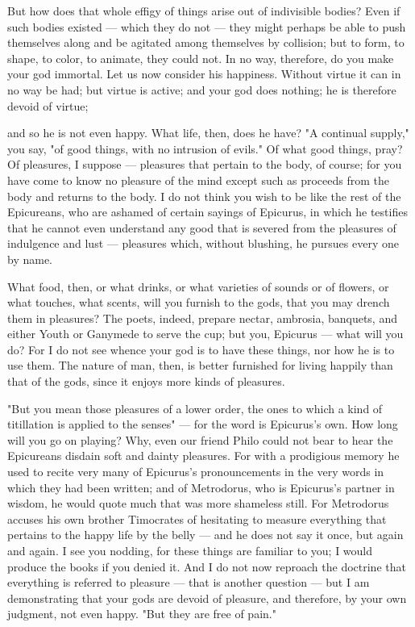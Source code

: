  But how does that whole effigy of things arise out of indivisible bodies? Even if such bodies existed — which they do not — they might perhaps be able to push themselves along and be agitated among themselves by collision; but to form, to shape, to color, to animate, they could not. In no way, therefore, do you make your god immortal. Let us now consider his happiness. Without virtue it can in no way be had; but virtue is active; and your god does nothing; he is therefore devoid of virtue;

 and so he is not even happy. What life, then, does he have? "A continual supply," you say, "of good things, with no intrusion of evils." Of what good things, pray? Of pleasures, I suppose — pleasures that pertain to the body, of course; for you have come to know no pleasure of the mind except such as proceeds from the body and returns to the body. I do not think you wish to be like the rest of the Epicureans, who are ashamed of certain sayings of Epicurus, in which he testifies that he cannot even understand any good that is severed from the pleasures of indulgence and lust — pleasures which, without blushing, he pursues every one by name.

 What food, then, or what drinks, or what varieties of sounds or of flowers, or what touches, what scents, will you furnish to the gods, that you may drench them in pleasures? The poets, indeed, prepare nectar, ambrosia, banquets, and either Youth or Ganymede to serve the cup; but you, Epicurus — what will you do? For I do not see whence your god is to have these things, nor how he is to use them. The nature of man, then, is better furnished for living happily than that of the gods, since it enjoys more kinds of pleasures.

 "But you mean those pleasures of a lower order, the ones to which a kind of titillation is applied to the senses" — for the word is Epicurus's own. How long will you go on playing? Why, even our friend Philo could not bear to hear the Epicureans disdain soft and dainty pleasures. For with a prodigious memory he used to recite very many of Epicurus's pronouncements in the very words in which they had been written; and of Metrodorus, who is Epicurus's partner in wisdom, he would quote much that was more shameless still. For Metrodorus accuses his own brother Timocrates of hesitating to measure everything that pertains to the happy life by the belly — and he does not say it once, but again and again. I see you nodding, for these things are familiar to you; I would produce the books if you denied it. And I do not now reproach the doctrine that everything is referred to pleasure — that is another question — but I am demonstrating that your gods are devoid of pleasure, and therefore, by your own judgment, not even happy. "But they are free of pain."

